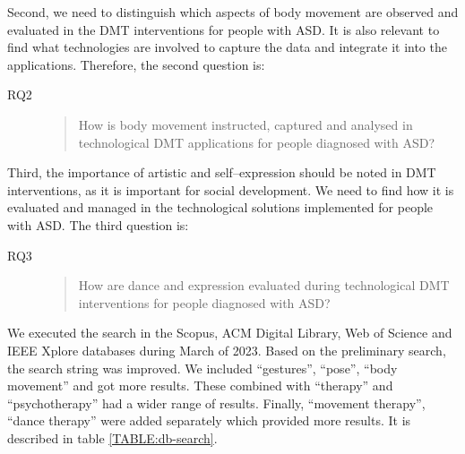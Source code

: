 \documentclass[a4paper,fleqn]{cas-sc}
\begin{document}
Second, we need to distinguish which aspects of body movement are observed and evaluated in the DMT interventions for people with ASD. It is also relevant to find what technologies are involved to capture the data and integrate it into the applications. Therefore, the second question is:

\begin{description}
  \item[RQ2] \begin{quote} How is body movement instructed, captured and analysed in technological DMT applications for people diagnosed with ASD? \end{quote}
\end{description}


Third, the importance of artistic and self--expression should be noted in DMT interventions, as it is important for social development. We need to find how it is evaluated and managed in the technological solutions implemented for people with ASD. The third question is:

\begin{description}
  \item[RQ3] \begin{quote} How are dance and expression evaluated during technological DMT interventions for people diagnosed with ASD? \end{quote}
\end{description}

We executed the search in the Scopus, ACM Digital Library, Web of Science and IEEE Xplore databases during March of 2023. Based on the preliminary search, the search string was improved. We included ``gestures'', ``pose'', ``body movement'' and got more results. These combined with ``therapy'' and ``psychotherapy'' had a wider range of results. Finally, ``movement therapy'', ``dance therapy'' were added separately which provided more results. It is described in table \ref{TABLE:db-search}.
\end{document}
